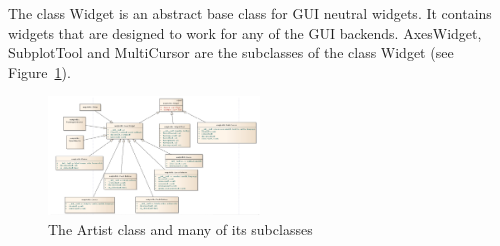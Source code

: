 \documentclass[pdftex,10pt,a4paper]{report}
\begin{document}
The class Widget is an abstract base class for GUI neutral widgets. It contains widgets that are designed to work for any of the GUI backends. AxesWidget, SubplotTool and MultiCursor are the subclasses of the class Widget (see Figure~\ref{fig:wd}).

\begin{figure}[ht!]
        \centering
                \includegraphics[width=0.5\textwidth]{img/umls/candy/Widget}
        \caption{The Artist class and many of its subclasses}\label{fig:wd}
\end{figure}






\end{document}
